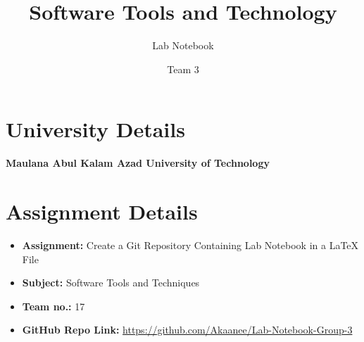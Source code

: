 \documentclass[a4paper,12pt]{report}
\title{Software Tools and Technology}
\author{Lab Notebook}
\date{Team 3}
\begin{document}
\maketitle

\section*{University Details}
\textbf{Maulana Abul Kalam Azad University of Technology}

\section*{Assignment Details}
\begin{itemize}
    \item \textbf{Assignment:} Create a Git Repository Containing Lab Notebook in a LaTeX File
    \item \textbf{Subject:} Software Tools and Techniques
    \item \textbf{Team no.:} 17
    \item \textbf{GitHub Repo Link:} \url{https://github.com/Akaanee/Lab-Notebook-Group-3}
\end{itemize}
\end{document}
